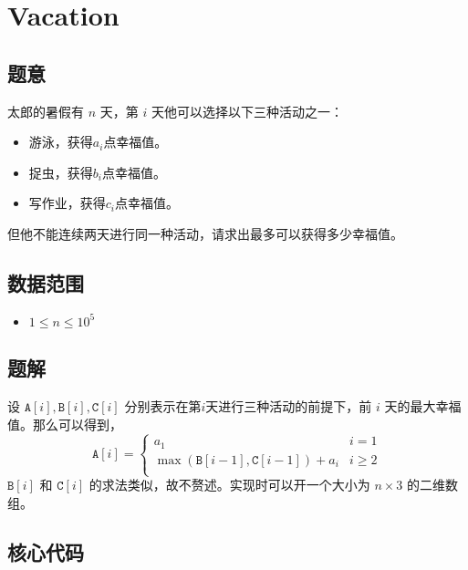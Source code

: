 \section{Vacation}
\subsection*{题意}
太郎的暑假有 $n$ 天，第  $i$ 天他可以选择以下三种活动之一：
\begin{itemize}
\item 游泳，获得$a_i$点幸福值。
\item 捉虫，获得$b_i$点幸福值。
\item 写作业，获得$c_i$点幸福值。
\end{itemize}
但他不能连续两天进行同一种活动，请求出最多可以获得多少幸福值。


\subsection*{数据范围}
\begin{itemize}
\item $1\le n\le 10^5$
\end{itemize}


\subsection*{题解}
设 ${\texttt{A}[i]},{\texttt{B}[i]},{\texttt{C}[i]}$ 分别表示在第$i$天进行三种活动的前提下，前 $i$ 天的最大幸福值。那么可以得到，
\begin{equation*}
{\texttt{A}[i]} = 
\begin{cases}
 a_1 & i = 1\\
\max({\texttt{B}[i-1]},{\texttt{C}[i-1]})+a_i & i \ge 2\\
\end{cases}
\end{equation*}
${\texttt{B}[i]}$ 和 ${\texttt{C}[i]}$ 的求法类似，故不赘述。实现时可以开一个大小为 $n \times 3$ 的二维数组。
\subsection*{核心代码}
\inputminted[linenos,autogobble]{cpp}{./Code/C.cpp}
\newpage